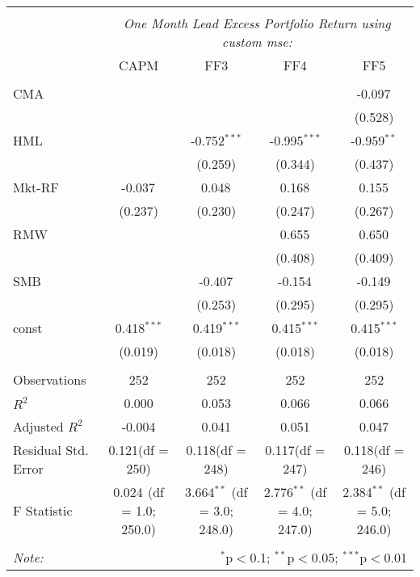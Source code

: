 \begin{table}[!htbp] \centering
\begin{tabular}{@{\extracolsep{5pt}}lcccc}
\\[-1.8ex]\hline
\hline \\[-1.8ex]
& \multicolumn{4}{c}{\textit{One Month Lead Excess Portfolio Return using custom mse:}} \
\cr \cline{4-5}
\\[-1.8ex] & CAPM & FF3 & FF4 & FF5 \\
\hline \\[-1.8ex]
 CMA & & & & -0.097$^{}$ \\
  & & & & (0.528) \\
 HML & & -0.752$^{***}$ & -0.995$^{***}$ & -0.959$^{**}$ \\
  & & (0.259) & (0.344) & (0.437) \\
 Mkt-RF & -0.037$^{}$ & 0.048$^{}$ & 0.168$^{}$ & 0.155$^{}$ \\
  & (0.237) & (0.230) & (0.247) & (0.267) \\
 RMW & & & 0.655$^{}$ & 0.650$^{}$ \\
  & & & (0.408) & (0.409) \\
 SMB & & -0.407$^{}$ & -0.154$^{}$ & -0.149$^{}$ \\
  & & (0.253) & (0.295) & (0.295) \\
 const & 0.418$^{***}$ & 0.419$^{***}$ & 0.415$^{***}$ & 0.415$^{***}$ \\
  & (0.019) & (0.018) & (0.018) & (0.018) \\
\hline \\[-1.8ex]
 Observations & 252 & 252 & 252 & 252 \\
 $R^2$ & 0.000 & 0.053 & 0.066 & 0.066 \\
 Adjusted $R^2$ & -0.004 & 0.041 & 0.051 & 0.047 \\
 Residual Std. Error & 0.121(df = 250) & 0.118(df = 248) & 0.117(df = 247) & 0.118(df = 246)  \\
 F Statistic & 0.024$^{}$ (df = 1.0; 250.0) & 3.664$^{**}$ (df = 3.0; 248.0) & 2.776$^{**}$ (df = 4.0; 247.0) & 2.384$^{**}$ (df = 5.0; 246.0) \\
\hline
\hline \\[-1.8ex]
\textit{Note:} & \multicolumn{4}{r}{$^{*}$p$<$0.1; $^{**}$p$<$0.05; $^{***}$p$<$0.01} \\
\end{tabular}
\end{table}
